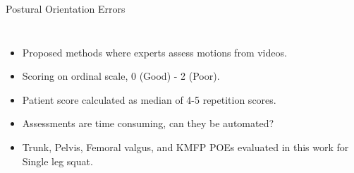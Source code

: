 \begin{frame}[fragile]{Postural Orientation Errors}
  \begin{columns}[T,onlytextwidth]
    \raggedleft
      \raggedright
      \vspace{0.3cm}
      \begin{itemize}
        \item Proposed methods where experts assess motions from videos\footnotemark.
        \item Scoring on ordinal scale, 0 (Good) - 2 (Poor).
        \item Patient score calculated as median of 4-5 repetition scores.
        \item Assessments are time consuming, can they be automated?
        \item Trunk, Pelvis, Femoral valgus, and KMFP POEs evaluated in this work for Single leg squat.
      \end{itemize}



\end{columns}
\end{frame}
